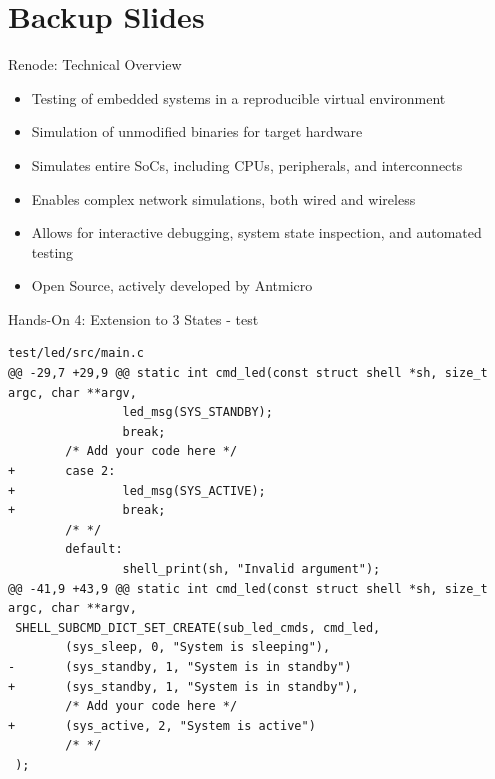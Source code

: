 \documentclass[10pt, aspectratio=169]{beamer}
\begin{document}
\section*{Backup Slides}
\begin{frame}[fragile]{Renode: Technical Overview}
  \begin{itemize}
    \item Testing of embedded systems in a reproducible virtual environment
    \item Simulation of unmodified binaries for target hardware
    \item Simulates entire SoCs, including CPUs, peripherals, and interconnects
    \item Enables complex network simulations, both wired and wireless
    \item Allows for interactive debugging, system state inspection, and automated testing
    \item Open Source, actively developed by Antmicro
  \end{itemize}
\end{frame}
\begin{frame}[fragile]{Hands-On 4: Extension to 3 States - test}
  \begin{verbatim}
test/led/src/main.c
@@ -29,7 +29,9 @@ static int cmd_led(const struct shell *sh, size_t argc, char **argv,
                led_msg(SYS_STANDBY);
                break;
        /* Add your code here */
+       case 2:
+               led_msg(SYS_ACTIVE);
+               break;
        /* */
        default:
                shell_print(sh, "Invalid argument");
@@ -41,9 +43,9 @@ static int cmd_led(const struct shell *sh, size_t argc, char **argv,
 SHELL_SUBCMD_DICT_SET_CREATE(sub_led_cmds, cmd_led,
        (sys_sleep, 0, "System is sleeping"),
-       (sys_standby, 1, "System is in standby")
+       (sys_standby, 1, "System is in standby"),
        /* Add your code here */
+       (sys_active, 2, "System is active")
        /* */
 );
  \end{verbatim}
\end{frame}
\end{document}

